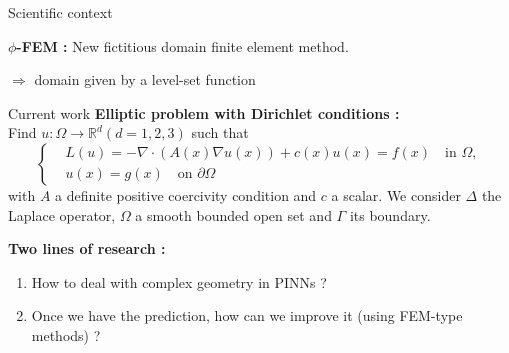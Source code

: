 \begin{frame}{Scientific context}
\begin{center}
\begin{tcolorbox}
\begin{figure}[htb]
{
				}%
			\end{figure}
		\end{tcolorbox}		
	\end{center}

	\vspace{2pt}
	\textbf{$\phi$-FEM :} New fictitious domain finite element method. \qquad {}
	
	$\Rightarrow$ domain given by a level-set function	
\end{frame}

\begin{frame}{Current work}
	\textbf{Elliptic problem with Dirichlet conditions :} \\
	Find $u : \Omega \rightarrow \mathbb{R}^d (d=1,2,3)$ such that
	\begin{equation}
		\left\{\begin{aligned}
			&L(u)=-\nabla \cdot (A(x) \nabla u(x)) + c(x)u(x) = f(x) \quad \text{in } \Omega, \\
			&u(x) = g(x) \quad \text{on } \partial \Omega
		\end{aligned}\right. \label{edp}
	\end{equation}
	with $A$ a definite positive coercivity condition and $c$ a scalar. We consider $\Delta$ the Laplace operator, $\Omega$ a smooth bounded open set and $\Gamma$ its boundary. 
	
	\vspace{10pt}
	
	\textbf{Two lines of research :} \\
	\begin{enumerate}
		\item How to deal with complex geometry in PINNs ?
		\item Once we have the prediction, how can we improve it (using FEM-type methods) ?
	\end{enumerate}
\end{frame}